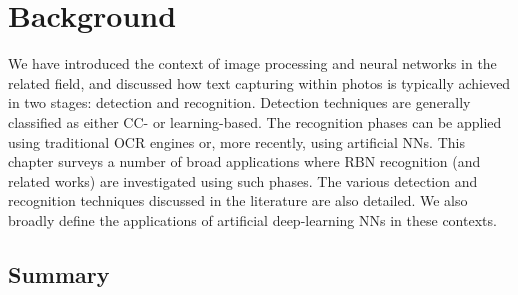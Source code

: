 \chapter{Background}
\label{ch:background}


We have introduced the context of image processing and neural networks in the related field, and discussed how text capturing within photos is typically achieved in two stages: detection and recognition. Detection techniques are generally classified as either CC- or learning-based. The recognition phases can be applied using traditional OCR engines or, more recently, using artificial NNs. This chapter surveys a number of broad applications where RBN recognition (and related works) are investigated using such phases. The various detection and recognition techniques discussed in the literature are also detailed. We also broadly define the applications of artificial deep-learning NNs in these contexts.

\section*{Summary}

